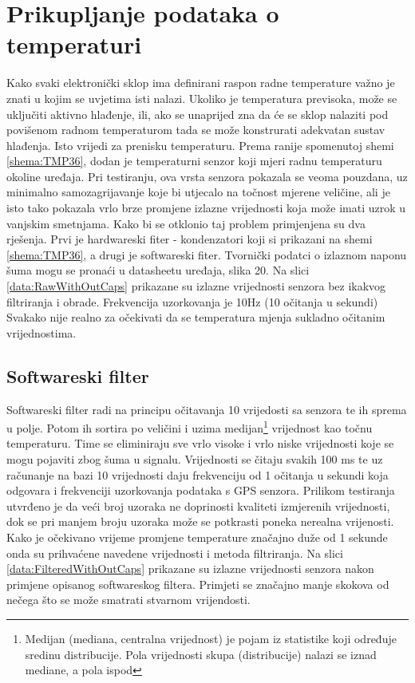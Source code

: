 \section{Prikupljanje podataka o temperaturi}\label{sec:TempData}
Kako svaki elektronički sklop ima definirani raspon radne temperature važno je znati u kojim se uvjetima isti nalazi.
Ukoliko je temperatura previsoka, može se uključiti aktivno hlađenje, ili, ako se unaprijed zna da će se sklop nalaziti pod povišenom radnom temperaturom tada se može konstrurati adekvatan sustav hlađenja.
Isto vrijedi za prenisku temperaturu.
Prema ranije spomenutoj shemi \ref{shema:TMP36}, dodan je temperaturni senzor koji mjeri radnu temperaturu okoline uređaja.
Pri testiranju, ova vrsta senzora pokazala se veoma pouzdana, uz minimalno samozagrijavanje koje bi utjecalo na točnost mjerene veličine, ali je isto tako pokazala vrlo brze promjene izlazne vrijednosti koja može imati uzrok u vanjskim smetnjama.
Kako bi se otklonio taj problem primjenjena su dva rješenja.
Prvi je hardwareski fiter - kondenzatori koji si prikazani na shemi \ref{shema:TMP36}, a drugi je softwareski fiter.
Tvornički podatci o izlaznom naponu šuma mogu se pronaći u datasheetu uređaja, slika 20.
Na slici \ref{data:RawWithOutCaps} prikazane su izlazne vrijednosti senzora bez ikakvog filtriranja i obrade.
Frekvencija uzorkovanja je 10Hz (10 očitanja u sekundi)
Svakako nije realno za očekivati da se temperatura mjenja sukladno očitanim vrijednostima.

\subsection{Softwareski filter}
Softwareski filter radi na principu očitavanja 10 vrijedosti sa senzora te ih sprema u polje.
Potom ih sortira po veličini i uzima medijan\footnote{Medijan (mediana, centralna vrijednost) je pojam iz statistike koji određuje sredinu distribucije.
Pola vrijednosti skupa (distribucije) nalazi se iznad mediane, a pola ispod} vrijednost kao točnu temperaturu.
Time se eliminiraju sve vrlo visoke i vrlo niske vrijednosti koje se mogu pojaviti zbog šuma u signalu.
Vrijednosti se čitaju svakih 100 ms te uz računanje na bazi 10 vrijednosti daju frekvenciju od 1 očitanja u sekundi koja odgovara i frekvenciji uzorkovanja podataka s GPS senzora.
Prilikom testiranja utvrđeno je da veći broj uzoraka ne doprinosti kvaliteti izmjerenih vrijednosti, dok se pri manjem broju uzoraka može se potkrasti poneka nerealna vrijenosti.
Kako je očekivano vrijeme promjene temperature značajno duže od 1 sekunde onda su prihvaćene navedene vrijednosti i metoda filtriranja.
Na slici \ref{data:FilteredWithOutCaps} prikazane su izlazne vrijednosti senzora nakon primjene opisanog softwareskog filtera.
Primjeti se značajno manje skokova od nečega što se može smatrati stvarnom vrijendosti. 

